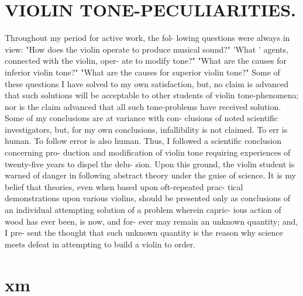 \documentclass{article}
\begin{document}
\section*{VIOLIN TONE-PECULIARITIES.}
Throughout my period for active work, the fol- lowing questions were always in view: "How does the violin operate to produce musical sound?" 'What ' agents, connected with the violin, oper- ate to modify tone?" "What are the causes for inferior violin tone?" "What are the causes for superior violin tone?" Some of these questions I have solved to my own satisfaction, but, no claim is advanced that such solutions will be acceptable to other students of violin tone-phenomena; nor is the claim advanced that all such tone-problems have received solution. Some of my conclusions are at variance with con- clusions of noted scientific investigators, but, for my own conclusions, infallibility is not claimed. To err is human. To follow error is also human. Thus, I followed a scientific conclusion concerning pro- duction and modification of violin tone requiring experiences of twenty-five years to dispel the delu- sion. Upon this ground, the violin student is warned of danger in following abstract theory under the guise of science. It is my belief that theories, even when based upon oft-repeated prac- tical demonstrations upon various violins, should be presented only as conclusions of an individual attempting solution of a problem wherein capric- ious action of wood has ever been, is now, and for- ever may remain an unknown quantity; and, I pre- sent the thought that such unknown quantity is the reason why science meets defeat in attempting to build a violin to order.

\section*{xm}
\end{document}
